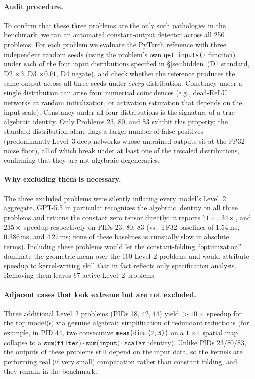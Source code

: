 \documentclass[11pt]{article}
\begin{document}
\paragraph{Audit procedure.} To confirm that these three problems are the only such pathologies in the benchmark, we ran an automated constant-output detector across all 250 problems. For each problem we evaluate the PyTorch reference with three independent random seeds (using the problem's own \texttt{get\_inputs()} function) under each of the four input distributions specified in \S\ref{sec:hidden} (D1 standard, D2 $\times 3$, D3 $\times 0.01$, D4 negate), and check whether the reference produces the same output across all three seeds under \emph{every} distribution. Constancy under a single distribution can arise from numerical coincidences (e.g., dead-ReLU networks at random initialization, or activation saturation that depends on the input scale). Constancy under all four distributions is the signature of a true algebraic identity. Only Problems 23, 80, and 83 exhibit this property; the standard distribution alone flags a larger number of false positives (predominantly Level~3 deep networks whose untrained outputs sit at the FP32 noise floor), all of which break under at least one of the rescaled distributions, confirming that they are not algebraic degeneracies.

\paragraph{Why excluding them is necessary.} The three excluded problems were silently inflating every model's Level~2 aggregate. GPT-5.5 in particular recognizes the algebraic identity on all three problems and returns the constant zero tensor directly: it reports $71\times$, $34\times$, and $235\times$ speedup respectively on PIDs 23, 80, 83 (vs.\ TF32 baselines of 1.54\,ms, 0.386\,ms, and 4.27\,ms; none of these baselines is unusually slow in absolute terms). Including these problems would let the constant-folding ``optimization'' dominate the geometric mean over the 100 Level~2 problems and would attribute speedup to kernel-writing skill that in fact reflects only specification analysis. Removing them leaves 97 active Level~2 problems.

\paragraph{Adjacent cases that look extreme but are not excluded.} Three additional Level~2 problems (PIDs 18, 42, 44) yield $>10\times$ speedup for the top model(s) via genuine algebraic simplification of redundant reductions (for example, in PID 44, two consecutive \texttt{mean(dim=(2,3))} on a $1{\times}1$ spatial map collapse to a $\texttt{sum(filter)}\cdot\texttt{sum(input)}\cdot\texttt{scalar}$ identity). Unlike PIDs 23/80/83, the outputs of these problems still depend on the input data, so the kernels are performing real (if very small) computation rather than constant folding, and they remain in the benchmark.
\end{document}
